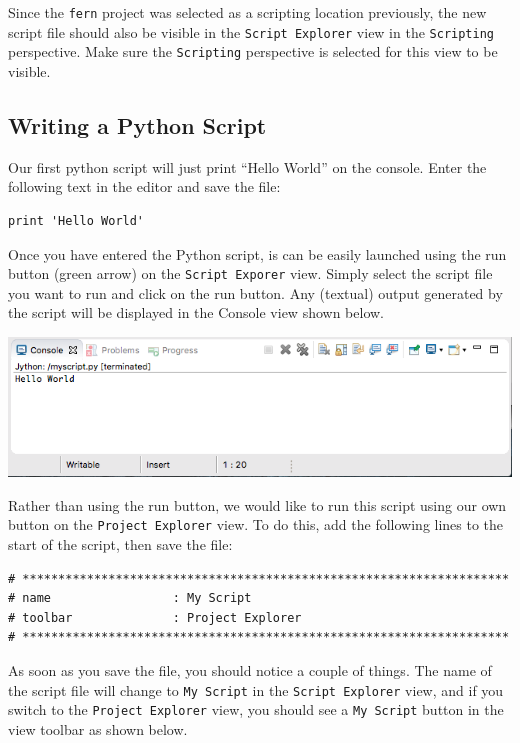Since the \texttt{fern} project was selected as a scripting location
previously, the new script file should also be visible in the \texttt{Script
Explorer} view in the \texttt{Scripting} perspective. Make sure the
\texttt{Scripting} perspective is selected for this view to be visible.

\subsection{Writing a Python Script}

Our first python script will just print ``Hello World'' on the console. Enter
the following text in the editor and save the file:

\begin{verbatim}
print 'Hello World'
\end{verbatim}

Once you have entered the Python script, is can be easily launched using the run
button (green arrow) on the \texttt{Script Exporer} view. Simply select the
script file you want to run and click on the run button. Any (textual)
output generated by the script will be displayed in the Console view shown
below.

\begin{center} \includegraphics[width=\textwidth]{images/console}
\end{center}

Rather than using the run button, we would like to run this script using our own
button on the \texttt{Project Explorer} view. To do this, add the following
lines to the start of the script, then save the file:

{\small
\begin{verbatim}
# ********************************************************************  
# name                 : My Script 
# toolbar              : Project Explorer  
# ******************************************************************** 
\end{verbatim}
}

As soon as you save the file, you should notice a couple of things. The name of
the script file will change to \texttt{My Script} in the \texttt{Script
Explorer} view, and if you switch to the \texttt{Project Explorer} view, you
should see a \texttt{My Script} button in the view toolbar as shown below.

